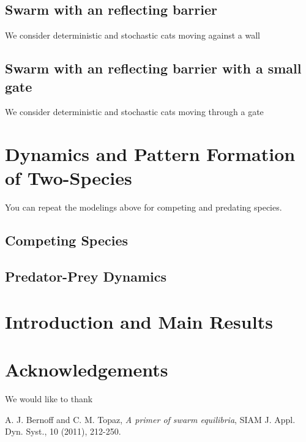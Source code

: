 \documentclass[twoside,12pt]{article}
\numberwithin{equation}{section}
\numberwithin{equation}{section}
\begin{document}
\subsection{Swarm with an reflecting barrier}
We consider deterministic and stochastic cats moving against a wall
\subsection{Swarm with an reflecting barrier with a small gate}
We consider deterministic and stochastic cats moving through a gate

\section{Dynamics and Pattern Formation of Two-Species}

You can repeat the modelings above for competing and predating species.
\subsection{Competing Species}

\subsection{Predator-Prey Dynamics}


\section{Introduction and Main Results}

 
\section*{Acknowledgements}
We would like to thank  


%
\begin{thebibliography}{*}
A. J. Bernoff and C. M. Topaz,
\emph{A primer of swarm equilibria}, SIAM J. Appl. Dyn. Syst., 10 (2011), 212-250. 

\end{thebibliography}
\end{document}
